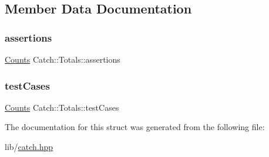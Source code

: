 \subsection{Member Data Documentation}
\hypertarget{struct_catch_1_1_totals_a885ded66df752147b30c3d45aa602ec9}{}\label{struct_catch_1_1_totals_a885ded66df752147b30c3d45aa602ec9} 
\subsubsection{\texorpdfstring{assertions}{assertions}}
{\footnotesize\ttfamily \hyperlink{struct_catch_1_1_counts}{Counts} Catch\+::\+Totals\+::assertions}

\hypertarget{struct_catch_1_1_totals_adb195fe477aedee2ecea88c888f16506}{}\label{struct_catch_1_1_totals_adb195fe477aedee2ecea88c888f16506} 
\subsubsection{\texorpdfstring{test\+Cases}{testCases}}
{\footnotesize\ttfamily \hyperlink{struct_catch_1_1_counts}{Counts} Catch\+::\+Totals\+::test\+Cases}



The documentation for this struct was generated from the following file\+:\begin{DoxyCompactItemize}
\item 
lib/\hyperlink{catch_8hpp}{catch.\+hpp}\end{DoxyCompactItemize}
